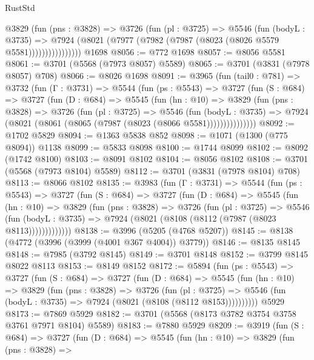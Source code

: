 \begin{lexlean}{RustStd}
\begin{coremodule}
{\begin{coremodule}
{{{{{{{{{{{{{{                @3829
                  (fun (pns : @3828) =>
                  @3726
                    (fun (pl : @3725) =>
                    @5546
                      (fun (bodyL : @3735) =>
                      @7924 (@8021 (@7977 (@7982 (@7987 (@8023 (@8026 @5579 @5581))))))))))))))))
    @1698
@8056 := @772 @1698
@8057 := @8056 @5581
@8061 := @3701 (@5568 (@7973 @8057) @5589)
@8065 := @3701 (@3831 (@7978 @8057) @708)
@8066 := @8026 @1698
@8091 := @3965
    (fun (tail0 : @781) =>
    @3732
      (fun (Γ : @3731) =>
      @5544
        (fun (ps : @5543) =>
        @3727
          (fun (S : @684) =>
          @3727
            (fun (D : @684) =>
            @5545
              (fun (hn : @10) =>
              @3829
                (fun (pns : @3828) =>
                @3726
                  (fun (pl : @3725) =>
                  @5546
                    (fun (bodyL : @3735) =>
                    @7924 (@8021 (@8061 (@8065 (@7987 (@8023 (@8066 @5581)))))))))))))))
@8092 := @1702 @5829
@8094 := @1363 @5838 @852
@8098 := @1071 (@1300 (@775 @8094)) @1138
@8099 := @5833 @8098
@8100 := @1744 @8099
@8102 := @8092 (@1742 @8100)
@8103 := @8091 @8102
@8104 := @8056 @8102
@8108 := @3701 (@5568 (@7973 @8104) @5589)
@8112 := @3701 (@3831 (@7978 @8104) @708)
@8113 := @8066 @8102
@8135 := @3983
    (fun (Γ : @3731) =>
    @5544
      (fun (ps : @5543) =>
      @3727
        (fun (S : @684) =>
        @3727
          (fun (D : @684) =>
          @5545
            (fun (hn : @10) =>
            @3829
              (fun (pns : @3828) =>
              @3726
                (fun (pl : @3725) =>
                @5546
                  (fun (bodyL : @3735) =>
                  @7924 (@8021 (@8108 (@8112 (@7987 (@8023 @8113)))))))))))))
@8138 := @3996 (@5205 (@4768 @5207))
@8145 := @8138 (@4772 (@3996 (@3999 (@4001 @367 @4004)) @3779))
@8146 := @8135 @8145
@8148 := @7985 (@3792 @8145)
@8149 := @3701 @8148
@8152 := @3799 @8145 @8022 @8113
@8153 := @8149 @8152
@8172 := @5894
    (fun (ps : @5543) =>
    @3727
      (fun (S : @684) =>
      @3727
        (fun (D : @684) =>
        @5545
          (fun (hn : @10) =>
          @3829
            (fun (pns : @3828) =>
            @3726
              (fun (pl : @3725) =>
              @5546 (fun (bodyL : @3735) => @7924 (@8021 (@8108 (@8112 @8153))))))))))
    @5929
@8173 := @7869 @5929
@8182 := @3701 (@5568 (@8173 @3782 @3754 @3758 @3761 @7971 @8104) @5589)
@8183 := @7880 @5929
@8209 := @3919
    (fun (S : @684) =>
    @3727
      (fun (D : @684) =>
      @5545
        (fun (hn : @10) =>
        @3829
          (fun (pns : @3828) =>
}}}}}}}}}}}}}}
\end{coremodule}}
\end{coremodule}
\end{lexlean}
